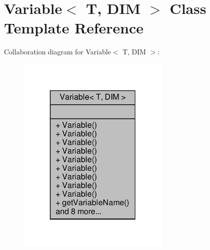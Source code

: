 \hypertarget{classVariable}{}\section{Variable$<$ T, D\+IM $>$ Class Template Reference}
\label{classVariable}


Collaboration diagram for Variable$<$ T, D\+IM $>$\+:\nopagebreak
\begin{figure}[H]
\begin{center}
\leavevmode
\includegraphics[width=208pt]{classVariable__coll__graph}
\end{center}
\end{figure}
